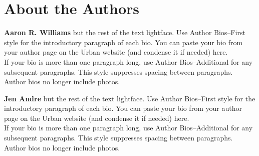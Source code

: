 \fancyfoot{}


\part{About the Authors}

\textbf{Aaron R. Williams} but the rest of the text lightface. Use Author Bios--First style for the introductory paragraph of each bio. You can paste your bio from your author page on the Urban website (and condense it if needed) here.\\
If your bio is more than one paragraph long, use Author Bios--Additional for any subsequent paragraphs. This style suppresses spacing between paragraphs.\\
Author bios no longer include photos.

\noindent\textbf{Jen Andre} but the rest of the text lightface. Use Author Bios--First style for the introductory paragraph of each bio. You can paste your bio from your author page on the Urban website (and condense it if needed) here.\\
If your bio is more than one paragraph long, use Author Bios--Additional for any subsequent paragraphs. This style suppresses spacing between paragraphs.\\
Author bios no longer include photos.